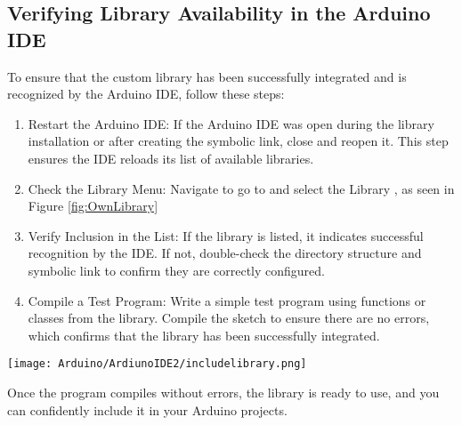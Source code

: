 {\bigskip






\bigskip



\subsection{Verifying Library Availability in the Arduino IDE}

To ensure that the custom library has been successfully integrated and is recognized by the Arduino IDE, follow these steps:

\begin{enumerate}
	
	\item Restart the Arduino IDE:
	If the Arduino IDE was open during the library installation or after creating the symbolic link, close and reopen it. This step ensures the IDE reloads its list of available libraries.
	
	\item Check the Library Menu: Navigate to  go to  and select the Library , as seen in Figure \ref{fig:OwnLibrary}
	
	\item Verify Inclusion in the List:
	If the library is listed, it indicates successful recognition by the IDE. If not, double-check the directory structure and symbolic link to confirm they are correctly configured.
	
	\item Compile a Test Program:
	Write a simple test program using functions or classes from the library. Compile the sketch to ensure there are no errors, which confirms that the library has been successfully integrated.
	
\end{enumerate}


\begin{center}\centering
	\texttt{[image: Arduino/ArdiunoIDE2/includelibrary.png]}
	\label{fig:OwnLibrary}		
\end{center}

Once the program compiles without errors, the library is ready to use, and you can confidently include it in your Arduino projects.












}
